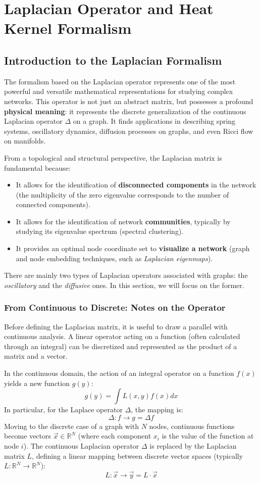 \chapter{Laplacian Operator and Heat Kernel Formalism}

\section{Introduction to the Laplacian Formalism}
The formalism based on the Laplacian operator represents one of the most powerful and versatile mathematical representations for studying complex networks. This operator is not just an abstract matrix, but possesses a profound \textbf{physical meaning}: it represents the discrete generalization of the continuous Laplacian operator \( \Delta \) on a graph. It finds applications in describing spring systems, oscillatory dynamics, diffusion processes on graphs, and even Ricci flow on manifolds.

From a topological and structural perspective, the Laplacian matrix is fundamental because:
\begin{itemize}
    \item It allows for the identification of \textbf{disconnected components} in the network (the multiplicity of the zero eigenvalue corresponds to the number of connected components).
    \item It allows for the identification of network \textbf{communities}, typically by studying its eigenvalue spectrum (spectral clustering).
    \item It provides an optimal node coordinate set to \textbf{visualize a network} (graph and node embedding techniques, such as \textit{Laplacian eigenmaps}).
\end{itemize}

There are mainly two types of Laplacian operators associated with graphs: the \textit{oscillatory} and the \textit{diffusive} ones. In this section, we will focus on the former.

\subsection{From Continuous to Discrete: Notes on the Operator}
Before defining the Laplacian matrix, it is useful to draw a parallel with continuous analysis. A linear operator acting on a function (often calculated through an integral) can be discretized and represented as the product of a matrix and a vector.

In the continuous domain, the action of an integral operator on a function \( f(x) \) yields a new function \( g(y) \):
\[
    g(y) = \int L(x,y)f(x)dx
\]
In particular, for the Laplace operator \( \Delta \), the mapping is:
\[
    \Delta : f \rightarrow g = \Delta f
\]
Moving to the discrete case of a graph with \( N \) nodes, continuous functions become vectors \( \vec{x} \in \mathbb{R}^N \) (where each component \( x_i \) is the value of the function at node \( i \)). The continuous Laplacian operator \( \Delta \) is replaced by the Laplacian matrix \( L \), defining a linear mapping between discrete vector spaces (typically \( L: \mathbb{R}^N \rightarrow \mathbb{R}^N \)):
\[
    L : \vec{x} \rightarrow \vec{y} = L \cdot \vec{x}
\]

